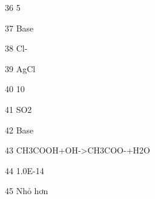 \begin{loigiaibt}{36}
 5
\end{loigiaibt}
\begin{loigiaibt}{37}
 Base
\end{loigiaibt}
\begin{loigiaibt}{38}
 Cl-
\end{loigiaibt}
\begin{loigiaibt}{39}
 AgCl
\end{loigiaibt}
\begin{loigiaibt}{40}
 10
\end{loigiaibt}
\begin{loigiaibt}{41}
 SO2
\end{loigiaibt}
\begin{loigiaibt}{42}
 Base
\end{loigiaibt}
\begin{loigiaibt}{43}
 CH3COOH+OH->CH3COO-+H2O
\end{loigiaibt}
\begin{loigiaibt}{44}
 1.0E-14
\end{loigiaibt}
\begin{loigiaibt}{45}
 Nhỏ hơn
\end{loigiaibt}
